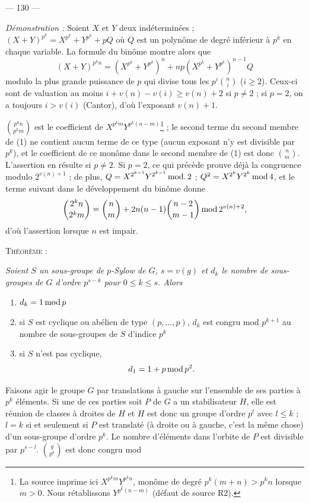 \documentclass[12pt,reqno]{amsart}
\newcommand{\sourcepage}[1]{%
  \clearpage
  \begin{center}
    --- #1 ---
  \end{center}
  \vspace{0.6em}
}
\begin{document}
\sourcepage{130}

\noindent\emph{Démonstration :} Soient $X$ et $Y$ deux indéterminées ; $(X+Y)^{p^k}=X^{p^k}+Y^{p^k}+pQ$ où $Q$ est un polynôme de degré inférieur à $p^k$ en chaque variable. La formule du binôme montre alors que
\begin{equation}
(X+Y)^{p^k n}=(X^{p^k}+Y^{p^k})^n+np(X^{p^k}+Y^{p^k})^{n-1}Q
\tag{1}
\end{equation}
modulo la plus grande puissance de $p$ qui divise tous les $p^i\binom{n}{i}$ ($i\geq2$). Ceux-ci sont de valuation au moins $i+v(n)-v(i)\geq v(n)+2$ si $p\neq2$ ; si $p=2$, on a toujours $i>v(i)$ (Cantor), d'où l'exposant $v(n)+1$.

$\binom{p^k n}{p^k m}$ est le coefficient de
$X^{p^k m}Y^{p^k(n-m)}$\footnote{La source imprime ici
$X^{p^km}Y^{p^kn}$, monôme de degré $p^k(m+n)>p^kn$ lorsque $m>0$.
Nous rétablissons $Y^{p^k(n-m)}$ (défaut de source R2).} ; le second
terme du second membre de (1) ne contient aucun terme de ce type (aucun
exposant n'y est divisible par $p^k$), et le coefficient de ce monôme
dans le second membre de (1) est donc $\binom{n}{m}$. L'assertion en
résulte si $p\neq2$. Si $p=2$, ce qui précède prouve déjà la congruence
modulo $2^{v(n)+1}$ ; de plus,
$Q=X^{2^{k-1}}Y^{2^{k-1}}\mathop{\rm mod.}2$ ;
$Q^2=X^{2^k}Y^{2^k}\mathop{\rm mod}4$, et le terme suivant dans le
développement du binôme donne
\[
\binom{2^k n}{2^k m}=\binom{n}{m}+2n(n-1)\binom{n-2}{m-1}\mathop{\rm mod}2^{v(n)+2},
\]
d'où l'assertion lorsque $n$ est impair.

\medskip
\noindent\textsc{Théorème} :

{\itshape
Soient $S$ un sous-groupe de $p$-Sylow de $G$, $s=v(g)$ et $d_k$ le nombre de sous-groupes de $G$ d'ordre $p^{s-k}$ pour $0\leq k\leq s$. Alors
\begin{enumerate}
\item[(i)] $d_k=1\mathop{\rm mod}p$
\item[(ii)] si $S$ est cyclique ou abélien de type $(p,\ldots,p)$, $d_k$ est congru mod $p^{k+1}$ au nombre de sous-groupes de $S$ d'indice $p^k$
\item[(iii)] si $S$ n'est pas cyclique,
\[
d_1=1+p\mathop{\rm mod}p^2.
\]
\end{enumerate}
}

Faisons agir le groupe $G$ par translations à gauche sur l'ensemble de ses parties à $p^k$ éléments. Si une de ces parties soit $P$ de $G$ a un stabilisateur $H$, elle est réunion de classes à droites de $H$ et $H$ est donc un groupe d'ordre $p^l$ avec $l\leq k$ ; $l=k$ si et seulement si $P$ est translaté (à droite ou à gauche, c'est la même chose) d'un sous-groupe d'ordre $p^k$. Le nombre d'éléments dans l'orbite de $P$ est divisible par $p^{s-l}$. $\binom{g}{p^k}$ est donc congru mod
\end{document}
